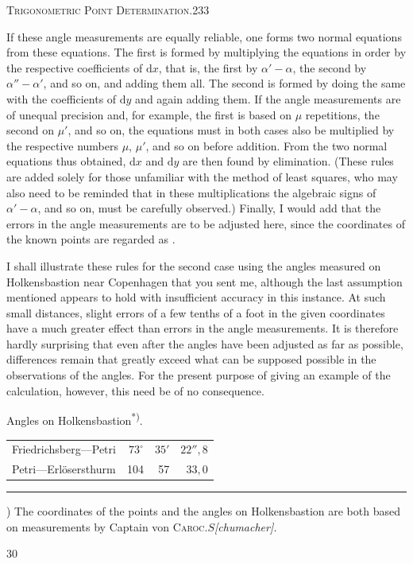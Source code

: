 \clearpage
\noindent\mbox{}\hfill\textsc{Trigonometric Point Determination.}\hfill233\par\medskip
If these angle measurements are equally reliable, one forms two normal equations from these equations. The first is formed by multiplying the equations in order by the respective coefficients of $\mathrm dx$, that is, the first by $\alpha'-\alpha$, the second by $\alpha''-\alpha'$, and so on, and adding them all. The second is formed by doing the same with the coefficients of $\mathrm dy$ and again adding them. If the angle measurements are of unequal precision and, for example, the first is based on $\mu$ repetitions, the second on $\mu'$, and so on, the equations must in both cases also be multiplied by the respective numbers $\mu$, $\mu'$, and so on before addition. From the two normal equations thus obtained, $\mathrm dx$ and $\mathrm dy$ are then found by elimination. (These rules are added solely for those unfamiliar with the method of least squares, who may also need to be reminded that in these multiplications the algebraic signs of $\alpha'-\alpha$, and so on, must be carefully observed.) Finally, I would add that  the errors in the angle measurements are to be adjusted here, since the coordinates of the known points are regarded as .

I shall illustrate these rules for the second case using the angles measured on Holkensbastion near Copenhagen that you sent me, although the last assumption mentioned appears to hold with insufficient accuracy in this instance. At such small distances, slight errors of a few tenths of a foot in the given coordinates have a much greater effect than errors in the angle measurements. It is therefore hardly surprising that even after the angles have been adjusted as far as possible, differences remain that greatly exceed what can be supposed possible in the observations of the angles. For the present purpose of giving an example of the calculation, however, this need be of no consequence.
\begin{center}
Angles on Holkensbastion\textsuperscript{*)}.
\end{center}
\begin{center}
\begin{tabular}{lrrr}
Friedrichsberg---Petri&$73^\circ$&$35'$&$22''{,}8$\\
Petri---Erlösersthurm&104&57&$33{,}0$
\end{tabular}
\end{center}
\vfill
\noindent\rule{4cm}{.4pt}\par
{\footnotesize *) The coordinates of the points and the angles on Holkensbastion are both based on measurements by Captain von \textsc{Caroc}.\quad $S$\textit{[chumacher].}\par}
\medskip{}\hfill30\hspace*{2cm}

